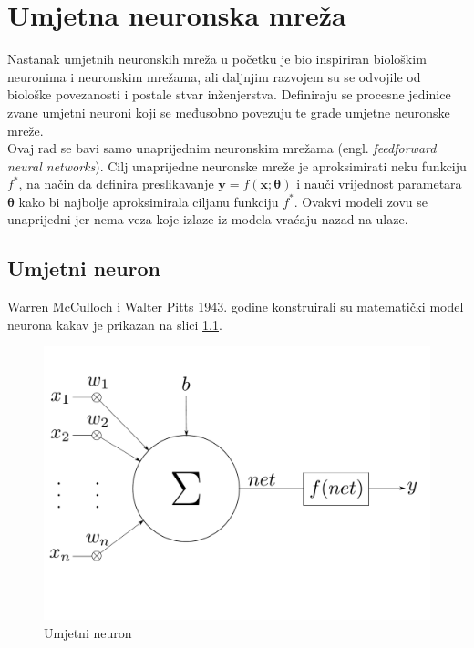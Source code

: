 \documentclass[times, utf8, zavrsni, numeric]{fer}
\renewcommand{\vec}[1]{\mathbf{#1}}
\begin{document}
\chapter{Umjetna neuronska mreža}

Nastanak umjetnih neuronskih mreža u početku je bio inspiriran biološkim 
neuronima i neuronskim mrežama, ali daljnjim razvojem su se odvojile od biološke
povezanosti i postale stvar inženjerstva. Definiraju se procesne jedinice 
zvane umjetni neuroni koji se međusobno povezuju te grade 
umjetne neuronske mreže. 
\\\indent Ovaj rad se bavi samo unaprijednim neuronskim
mrežama (engl. \textit{feedforward neural networks}). Cilj unaprijedne
neuronske mreže je aproksimirati neku funkciju $f^*$, na način da definira
preslikavanje $\vec{y} = f(\vec{x};\pmb{\theta})$ i nauči vrijednost
parametara $\pmb{\theta}$ kako bi najbolje aproksimirala ciljanu funkciju $f^*$.
Ovakvi modeli zovu se unaprijedni jer nema veza koje izlaze iz modela vraćaju
nazad na ulaze.


\section{Umjetni neuron}
Warren McCulloch i Walter Pitts 1943. godine konstruirali su matematički model
neurona kakav je prikazan na slici \ref{fig:umjetni_neuron}.

\begin{figure}[htbp]
	\centering
	\includegraphics[scale=0.3]{moj_umjetni_neuron.pdf}
	\caption{Umjetni neuron}
	\label{fig:umjetni_neuron}
\end{figure}
\end{document}
